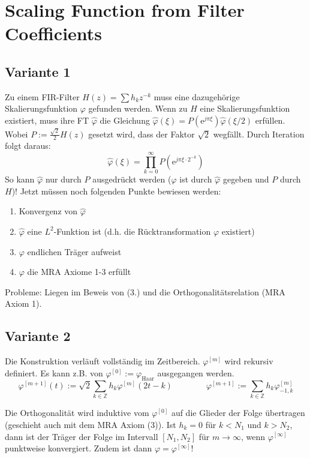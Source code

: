 \section{Scaling Function from Filter Coefficients}

\subsection{Variante 1}
Zu einem FIR-Filter $H(z)=\sum h_k z^{-k}$ muss eine dazugehörige Skalierungsfunktion $\varphi$ gefunden werden.
Wenn zu $H$ eine Skalierungsfunktion existiert, muss ihre FT $\hat{\varphi}$ die Gleichung $\hat{\varphi}(\xi)=P(\mathrm{e}^{j\pi\xi})\hat{\varphi}(\xi/2)$ erfüllen. Wobei $P:=\frac{\sqrt{2}}{2}H(z)$ gesetzt wird, dass der Faktor $\sqrt{2}$ wegfällt. Durch Iteration folgt daraus:
\[ \hat{\varphi}(\xi) = \prod_{k=0}^{\infty}P(\mathrm{e}^{j\pi\xi\cdot 2^{-k}}) \]
So kann $\hat{\varphi}$ nur durch $P$ ausgedrückt werden ($\varphi$ ist durch $\hat{\varphi}$ gegeben und $P$ durch $H$)!
Jetzt müssen noch folgenden Punkte bewiesen werden:

\vspace{-0.4cm}

\begin{enumerate}
	\itemsep-0.2cm
	\item Konvergenz von $\hat{\varphi}$
	\item $\hat{\varphi}$ eine $L^2$-Funktion ist (d.h. die Rücktransformation $\varphi$ existiert)
	\item $\varphi$ endlichen Träger aufweist
	\item $\varphi$ die MRA Axiome 1-3 erfüllt
\end{enumerate}
Probleme: Liegen im Beweis von (3.) und die Orthogonalitätsrelation (MRA Axiom 1).


\subsection{Variante 2}
Die Konstruktion verläuft vollständig im Zeitbereich. $\varphi^{[m]}$ wird rekursiv definiert. Es kann z.B. von $\varphi^{[0]}:=\varphi_{\text{Haar}}$ ausgegangen werden.
\[ 
	\varphi^{[m+1]}(t) := \sqrt{2} \sum_{k \in \mathbb{Z}} h_k \varphi^{[m]}(2t-k) 
	\qquad \qquad
	\varphi^{[m+1]} := \sum_{k \in \mathbb{Z}} h_k \varphi^{[m]}_{-1,k} 
\]

Die Orthogonalität wird induktive vom $\varphi^{[0]}$ auf die Glieder der Folge übertragen (geschieht auch mit dem MRA Axiom (3)).
Ist $h_k=0$ für $k<N_1$ und $k>N_2$, dann ist der Träger der Folge im Intervall $[N_1,N_2]$ für $m\rightarrow\infty$, wenn $\varphi^{[\infty]}$ punktweise konvergiert. Zudem ist dann $\varphi = \varphi^{[\infty]}$!\\

